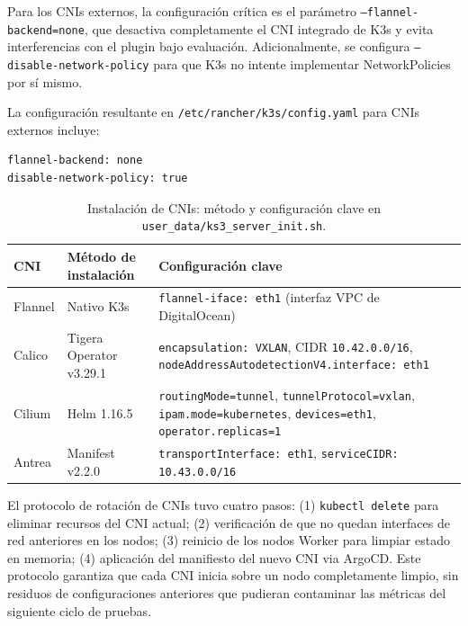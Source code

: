 Para los CNIs externos, la configuración crítica es el parámetro \texttt{--flannel-backend=none}, que desactiva completamente el CNI integrado de K3s y evita interferencias con el plugin bajo evaluación. Adicionalmente, se configura \texttt{--disable-network-policy} para que K3s no intente implementar NetworkPolicies por sí mismo.

La configuración resultante en \texttt{/etc/rancher/k3s/config.yaml} para CNIs externos incluye:
\begin{lstlisting}
flannel-backend: none
disable-network-policy: true
\end{lstlisting}

\begin{table}[htbp]
\centering
\scriptsize
\renewcommand{\arraystretch}{1.25}
\setlength{\tabcolsep}{4pt}
\caption{Instalación de CNIs: método y configuración clave en \texttt{user\_data/ks3\_server\_init.sh}.}
\label{tab:cni-instalacion}
\begin{tabularx}{\textwidth}{|l|p{3.2cm}|Y|}
\hline
\textbf{CNI} & \textbf{Método de instalación} & \textbf{Configuración clave} \\
\hline
Flannel & Nativo K3s & \texttt{flannel-iface: eth1} (interfaz VPC de DigitalOcean) \\
\hline
Calico & Tigera Operator v3.29.1 & \texttt{encapsulation: VXLAN}, CIDR \texttt{10.42.0.0/16}, \texttt{nodeAddressAutodetectionV4.interface: eth1} \\
\hline
Cilium & Helm 1.16.5 & \texttt{routingMode=tunnel}, \texttt{tunnelProtocol=vxlan}, \texttt{ipam.mode=kubernetes}, \texttt{devices=eth1}, \texttt{operator.replicas=1} \\
\hline
Antrea & Manifest v2.2.0 & \texttt{transportInterface: eth1}, \texttt{serviceCIDR: 10.43.0.0/16} \\
\hline
\end{tabularx}
\end{table}

El protocolo de rotación de CNIs tuvo cuatro pasos: (1) \texttt{kubectl delete} para eliminar recursos del CNI actual; (2) verificación de que no quedan interfaces de red anteriores en los nodos; (3) reinicio de los nodos Worker para limpiar estado en memoria; (4) aplicación del manifiesto del nuevo CNI via ArgoCD. Este protocolo garantiza que cada CNI inicia sobre un nodo completamente limpio, sin residuos de configuraciones anteriores que pudieran contaminar las métricas del siguiente ciclo de pruebas.

